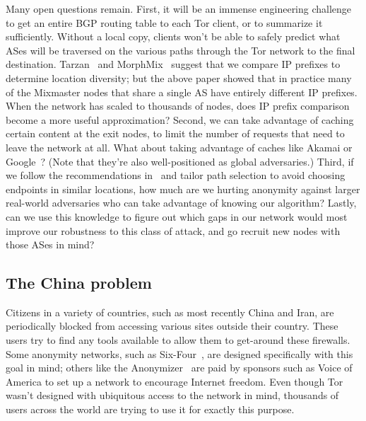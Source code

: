 \documentclass{llncs}
\begin{document}
Many open questions remain. First, it will be an immense engineering
challenge to get an entire BGP routing table to each Tor client, or to
summarize it sufficiently. Without a local copy, clients won't be
able to safely predict what ASes will be traversed on the various paths
through the Tor network to the final destination. Tarzan~\cite{tarzan:ccs02}
and MorphMix~\cite{morphmix:fc04} suggest that we compare IP prefixes to
determine location diversity; but the above paper showed that in practice
many of the Mixmaster nodes that share a single AS have entirely different
IP prefixes. When the network has scaled to thousands of nodes, does IP
prefix comparison become a more useful approximation?
%
Second, we can take advantage of caching certain content at the
exit nodes, to limit the number of requests that need to leave the
network at all. What about taking advantage of caches like Akamai or
Google~\cite{shsm03}? (Note that they're also well-positioned as global
adversaries.)
%
Third, if we follow the recommendations in~\cite{feamster:wpes2004}
 and tailor path selection
to avoid choosing endpoints in similar locations, how much are we hurting
anonymity against larger real-world adversaries who can take advantage
of knowing our algorithm?
%
Lastly, can we use this knowledge to figure out which gaps in our network
would most improve our robustness to this class of attack, and go recruit
new nodes with those ASes in mind?


\subsection{The China problem}
\label{subsec:china}

Citizens in a variety of countries, such as most recently China and
Iran, are periodically blocked from accessing various sites outside
their country. These users try to find any tools available to allow
them to get-around these firewalls. Some anonymity networks, such as
Six-Four~\cite{six-four}, are designed specifically with this goal in
mind; others like the Anonymizer~\cite{anonymizer} are paid by sponsors
such as Voice of America to set up a network to encourage Internet
freedom. Even though Tor wasn't
designed with ubiquitous access to the network in mind, thousands of
users across the world are trying to use it for exactly this purpose.
\end{document}
